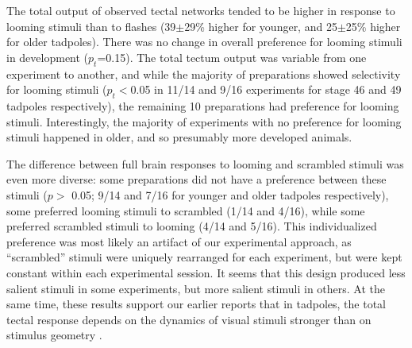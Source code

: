 \documentclass{article}
\begin{document}
The total output of observed tectal networks tended to be higher in response to looming stimuli than to flashes (39$\pm$29\% higher for younger, and 25$\pm$25\% higher for older tadpoles). There was no change in overall preference for looming stimuli in development ($p_t$=0.15). The total tectum output was variable from one experiment to another, and while the majority of preparations showed selectivity for looming stimuli ($p_t<$0.05 in 11/14 and 9/16 experiments for stage 46 and 49 tadpoles respectively), the remaining 10 preparations had preference for looming stimuli. Interestingly, the majority of experiments with no preference for looming stimuli happened in older, and so presumably more developed animals.

The difference between full brain responses to looming and scrambled stimuli was even more diverse: some preparations did not have a preference between these stimuli ($p>$ 0.05; 9/14 and 7/16 for younger and older tadpoles respectively), some preferred looming stimuli to scrambled (1/14 and 4/16), while some preferred scrambled stimuli to looming (4/14 and 5/16). This individualized preference was most likely an artifact of our experimental approach, as “scrambled” stimuli were uniquely rearranged for each experiment, but were kept constant within each experimental session. It seems that this design produced less salient stimuli in some experiments, but more salient stimuli in others. At the same time, these results support our earlier reports that in tadpoles, the total tectal response depends on the dynamics of visual stimuli stronger than on stimulus geometry \citep{khakhalin2014,jang2016}.
\end{document}
